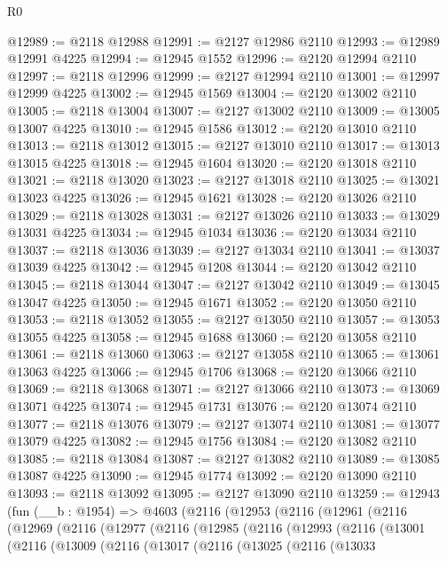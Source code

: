 \begin{lexlean}{R0}
\begin{coremodule}
@12989 := @2118 @12988
@12991 := @2127 @12986 @2110
@12993 := @12989 @12991 @4225
@12994 := @12945 @1552
@12996 := @2120 @12994 @2110
@12997 := @2118 @12996
@12999 := @2127 @12994 @2110
@13001 := @12997 @12999 @4225
@13002 := @12945 @1569
@13004 := @2120 @13002 @2110
@13005 := @2118 @13004
@13007 := @2127 @13002 @2110
@13009 := @13005 @13007 @4225
@13010 := @12945 @1586
@13012 := @2120 @13010 @2110
@13013 := @2118 @13012
@13015 := @2127 @13010 @2110
@13017 := @13013 @13015 @4225
@13018 := @12945 @1604
@13020 := @2120 @13018 @2110
@13021 := @2118 @13020
@13023 := @2127 @13018 @2110
@13025 := @13021 @13023 @4225
@13026 := @12945 @1621
@13028 := @2120 @13026 @2110
@13029 := @2118 @13028
@13031 := @2127 @13026 @2110
@13033 := @13029 @13031 @4225
@13034 := @12945 @1034
@13036 := @2120 @13034 @2110
@13037 := @2118 @13036
@13039 := @2127 @13034 @2110
@13041 := @13037 @13039 @4225
@13042 := @12945 @1208
@13044 := @2120 @13042 @2110
@13045 := @2118 @13044
@13047 := @2127 @13042 @2110
@13049 := @13045 @13047 @4225
@13050 := @12945 @1671
@13052 := @2120 @13050 @2110
@13053 := @2118 @13052
@13055 := @2127 @13050 @2110
@13057 := @13053 @13055 @4225
@13058 := @12945 @1688
@13060 := @2120 @13058 @2110
@13061 := @2118 @13060
@13063 := @2127 @13058 @2110
@13065 := @13061 @13063 @4225
@13066 := @12945 @1706
@13068 := @2120 @13066 @2110
@13069 := @2118 @13068
@13071 := @2127 @13066 @2110
@13073 := @13069 @13071 @4225
@13074 := @12945 @1731
@13076 := @2120 @13074 @2110
@13077 := @2118 @13076
@13079 := @2127 @13074 @2110
@13081 := @13077 @13079 @4225
@13082 := @12945 @1756
@13084 := @2120 @13082 @2110
@13085 := @2118 @13084
@13087 := @2127 @13082 @2110
@13089 := @13085 @13087 @4225
@13090 := @12945 @1774
@13092 := @2120 @13090 @2110
@13093 := @2118 @13092
@13095 := @2127 @13090 @2110
@13259 := @12943
    (fun (__b : @1954) =>
    @4603
      (@2116
        (@12953
          (@2116
            (@12961
              (@2116
                (@12969
                  (@2116
                    (@12977
                      (@2116
                        (@12985
                          (@2116
                            (@12993
                              (@2116
                                (@13001
                                  (@2116
                                    (@13009
                                      (@2116
                                        (@13017
                                          (@2116
                                            (@13025
                                              (@2116
                                                (@13033

\end{coremodule}
\end{lexlean}
